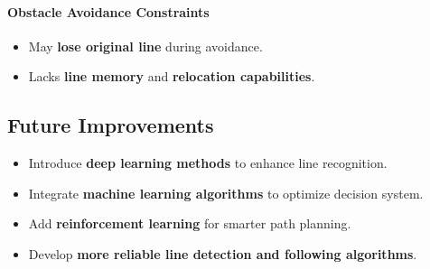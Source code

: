 \documentclass[12pt,a4paper]{article}
\begin{document}
\paragraph{Obstacle Avoidance Constraints}
\begin{itemize}
  \item May \textbf{lose original line} during avoidance.
  \item Lacks \textbf{line memory} and \textbf{relocation capabilities}.
\end{itemize}

\subsection{Future Improvements}

\begin{itemize}
  \item Introduce \textbf{deep learning methods} to enhance line recognition.
  \item Integrate \textbf{machine learning algorithms} to optimize decision system.
  \item Add \textbf{reinforcement learning} for smarter path planning.
  \item Develop \textbf{more reliable line detection and following algorithms}.
\end{itemize}
\end{document}
